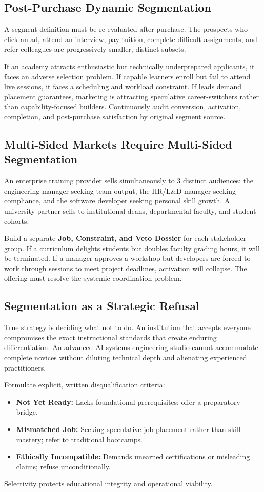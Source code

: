 \subsection{Post-Purchase Dynamic Segmentation}

A segment definition must be re-evaluated after purchase. The prospects who click an ad, attend an interview, pay tuition, complete difficult assignments, and refer colleagues are progressively smaller, distinct subsets.

If an academy attracts enthusiastic but technically underprepared applicants, it faces an adverse selection problem. If capable learners enroll but fail to attend live sessions, it faces a scheduling and workload constraint. If leads demand placement guarantees, marketing is attracting speculative career-switchers rather than capability-focused builders. Continuously audit conversion, activation, completion, and post-purchase satisfaction by original segment source.

\subsection{Multi-Sided Markets Require Multi-Sided Segmentation}

An enterprise training provider sells simultaneously to 3 distinct audiences: the engineering manager seeking team output, the HR/L\&D manager seeking compliance, and the software developer seeking personal skill growth. A university partner sells to institutional deans, departmental faculty, and student cohorts.

Build a separate \textbf{Job, Constraint, and Veto Dossier} for each stakeholder group. If a curriculum delights students but doubles faculty grading hours, it will be terminated. If a manager approves a workshop but developers are forced to work through sessions to meet project deadlines, activation will collapse. The offering must resolve the systemic coordination problem.

\subsection{Segmentation as a Strategic Refusal}

True strategy is deciding what not to do. An institution that accepts everyone compromises the exact instructional standards that create enduring differentiation. An advanced AI systems engineering studio cannot accommodate complete novices without diluting technical depth and alienating experienced practitioners.

Formulate explicit, written disqualification criteria:
\begin{itemize}[leftmargin=1.2em,itemsep=0.2ex]
  \item \textbf{Not Yet Ready:} Lacks foundational prerequisites; offer a preparatory bridge.
  \item \textbf{Mismatched Job:} Seeking speculative job placement rather than skill mastery; refer to traditional bootcamps.
  \item \textbf{Ethically Incompatible:} Demands unearned certifications or misleading claims; refuse unconditionally.
\end{itemize}
Selectivity protects educational integrity and operational viability.
